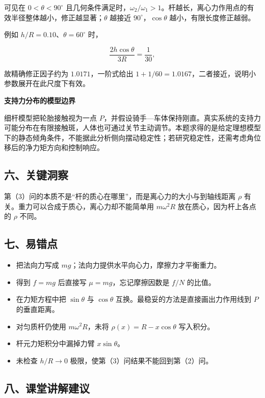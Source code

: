 \documentclass[12pt,a4paper,UTF8]{ctexart}
\newcommand{\tightlist}{\setlength{\itemsep}{0pt}\setlength{\parskip}{0pt}}
\begin{document}
可见在 \(0<\theta<90^\circ\)
且几何条件满足时，\(\omega_2/\omega_1>1\)。杆越长，离心力作用点的有效半径整体越小，修正越显著；\(\theta\)
越接近 \(90^\circ\)，\(\cos\theta\) 越小，有限长度修正越弱。

例如 \(h/R=0.10\)、\(\theta=60^\circ\) 时，

\[
\frac{2h\cos\theta}{3R}=\frac1{30},
\]

故精确修正因子约为 \(1.0171\)，一阶式给出
\(1+1/60=1.0167\)，二者接近，说明小参数展开在此尺度下有效。

\textbf{支持力分布的模型边界}

细杆模型把轮胎接触视为一点
\(P\)，并假设骑手---车体保持刚直。真实系统的支持力可能分布在有限接触斑，人体也可通过关节主动调节。本题求得的是给定理想模型下的静态倾角条件，不能据此分析侧向摆动稳定性；若研究稳定性，还需考虑角位移后的净力矩方向和控制响应。

\subsection{六、关键洞察}\label{ux516dux5173ux952eux6d1eux5bdf-4}

第（3）问的本质不是``杆的质心在哪里''，而是离心力的大小与到轴线距离
\(\rho\) 有关。重力可以合成于质心，离心力却不能简单用 \(m\omega^2R\)
放在质心，因为杆上各点的 \(\rho\) 不同。

\subsection{七、易错点}\label{ux4e03ux6613ux9519ux70b9-4}

\begin{itemize}
\tightlist
\item
  把法向力写成 \(mg\)；法向力提供水平向心力，摩擦力才平衡重力。
\item
  得到 \(f=mg\) 后直接写 \(\mu=mg\)，忘记摩擦因数是 \(f/N\) 的比值。
\item
  在力矩方程中把 \(\sin\theta\) 与 \(\cos\theta\)
  互换。最稳妥的方法是直接画出力作用线到 \(P\) 的垂直距离。
\item
  对匀质杆仍使用 \(m\omega^2R\)，未将 \(\rho(x)=R-x\cos\theta\)
  写入积分。
\item
  杆元力矩积分中漏掉力臂 \(x\sin\theta\)。
\item
  未检查 \(h/R\to0\) 极限，使第（3）问结果不能回到第（2）问。
\end{itemize}

\subsection{八、课堂讲解建议}\label{ux516bux8bfeux5802ux8bb2ux89e3ux5efaux8bae-4}
\end{document}
